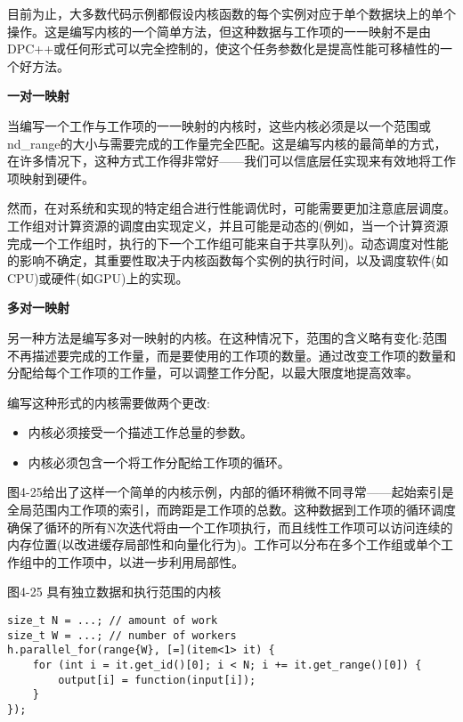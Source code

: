 目前为止，大多数代码示例都假设内核函数的每个实例对应于单个数据块上的单个操作。这是编写内核的一个简单方法，但这种数据与工作项的一一映射不是由DPC++或任何形式可以完全控制的，使这个任务参数化是提高性能可移植性的一个好方法。\par

\hspace*{\fill} \par %
\textbf{一对一映射}

当编写一个工作与工作项的一一映射的内核时，这些内核必须是以一个范围或nd\_range的大小与需要完成的工作量完全匹配。这是编写内核的最简单的方式，在许多情况下，这种方式工作得非常好——我们可以信底层任实现来有效地将工作项映射到硬件。\par

然而，在对系统和实现的特定组合进行性能调优时，可能需要更加注意底层调度。工作组对计算资源的调度由实现定义，并且可能是动态的(例如，当一个计算资源完成一个工作组时，执行的下一个工作组可能来自于共享队列)。动态调度对性能的影响不确定，其重要性取决于内核函数每个实例的执行时间，以及调度软件(如CPU)或硬件(如GPU)上的实现。\par

\hspace*{\fill} \par %
\textbf{多对一映射}

另一种方法是编写多对一映射的内核。在这种情况下，范围的含义略有变化:范围不再描述要完成的工作量，而是要使用的工作项的数量。通过改变工作项的数量和分配给每个工作项的工作量，可以调整工作分配，以最大限度地提高效率。\par

编写这种形式的内核需要做两个更改:\par

\begin{itemize}
	\item 内核必须接受一个描述工作总量的参数。
	\item 内核必须包含一个将工作分配给工作项的循环。
\end{itemize}

图4-25给出了这样一个简单的内核示例，内部的循环稍微不同寻常——起始索引是全局范围内工作项的索引，而跨距是工作项的总数。这种数据到工作项的循环调度确保了循环的所有N次迭代将由一个工作项执行，而且线性工作项可以访问连续的内存位置(以改进缓存局部性和向量化行为)。工作可以分布在多个工作组或单个工作组中的工作项中，以进一步利用局部性。\par

\hspace*{\fill} \par %
图4-25 具有独立数据和执行范围的内核
\begin{lstlisting}[caption={}]
size_t N = ...; // amount of work
size_t W = ...; // number of workers
h.parallel_for(range{W}, [=](item<1> it) {
	for (int i = it.get_id()[0]; i < N; i += it.get_range()[0]) {
		output[i] = function(input[i]);
	}
});
\end{lstlisting}

